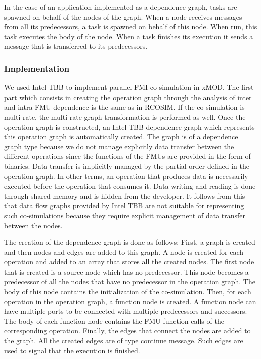 In the case of an application implemented as a dependence graph, tasks are spawned on behalf of the nodes of the graph. When a node receives messages from all its predecessors, a task is spawned on behalf of this node. When run, this task executes the body of the node. When a task finishes its execution it sends a message that is transferred to its predecessors. 

\subsubsection{Implementation}

We used Intel TBB to implement parallel FMI co-simulation in xMOD. The first part which consists in creating the operation graph through the analysis of inter and intra-FMU dependence is the same as in RCOSIM. If the co-simulation is multi-rate, the multi-rate graph transformation is performed as well. Once the operation graph is constructed, an Intel TBB dependence graph which represents this operation graph is automatically created. The graph is of a dependence graph type because we do not manage explicitly data transfer between the different operations since the functions of the FMUs are provided in the form of binaries. Data transfer is implicitly managed by the partial order defined in the operation graph. In other terms, an operation that produces data is necessarily executed before the operation that consumes it. Data writing and reading is done through shared memory and is hidden from the developer. It follows from this that data flow graphs provided by Intel TBB are not suitable for representing such co-simulations because they require explicit management of data transfer between the nodes.

The creation of the dependence graph is done as follows: First, a graph is created and then nodes and edges are added to this graph. A node is created for each operation and added to an array that stores all the created nodes. The first node that is created is a source node which has no predecessor. This node becomes a predecessor of all the nodes that have no predecessor in the operation graph. The body of this node contains the initialization of the co-simulation. Then, for each operation in the operation graph, a function node is created. A function node can have multiple ports to be connected with multiple predecessors and successors. The body of each function node contains the FMU function calls of the corresponding operation. Finally, the edges that connect the nodes are added to the graph. All the created edges are of type continue message. Such edges are used to signal that the execution is finished.   

